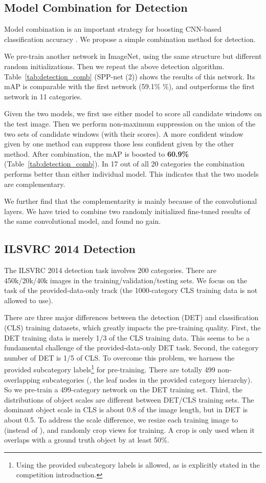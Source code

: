 \documentclass[10pt,journal,cspaper,compsoc]{IEEEtran}
\begin{document}
\subsection{Model Combination for Detection}

Model combination is an important strategy for boosting CNN-based classification accuracy \cite{Krizhevsky2012}. We propose a simple combination method for detection.

We pre-train another network in ImageNet, using the same structure but different random initializations. Then we repeat the above detection algorithm. Table~\ref{tab:detection_comb} (SPP-net (2)) shows the results of this network. Its mAP is comparable with the first network (59.1\% \%), and outperforms the first network in 11 categories.

Given the two models, we first use either model to score all candidate windows on the test image.
Then we perform non-maximum suppression on the union of the two sets of candidate windows (with their scores).
A more confident window given by one method can suppress those less confident given by the other method. After combination, the mAP is boosted to \textbf{60.9\%} (Table~\ref{tab:detection_comb}). In 17 out of all 20 categories the combination performs better than either individual model. This indicates that the two models are complementary.

We further find that the complementarity is mainly because of the convolutional layers. We have tried to combine two randomly initialized fine-tuned results of the same convolutional model, and found no gain.

\subsection{ILSVRC 2014 Detection}

The ILSVRC 2014 detection \cite{Russakovsky2014} task involves 200 categories. There are 450k/20k/40k images in the training/validation/testing sets. We focus on the task of the provided-data-only track (the 1000-category CLS training data is not allowed to use).

There are three major differences between the detection (DET) and classification (CLS) training datasets, which greatly impacts the pre-training quality. First, the DET training data is merely 1/3 of the CLS training data. This seems to be a fundamental challenge of the provided-data-only DET task. Second, the category number of DET is 1/5 of CLS. To overcome this problem, we harness the provided subcategory labels\footnote{Using the provided subcategory labels is allowed, as is explicitly stated in the competition introduction.} for pre-training. There are totally 499 non-overlapping subcategories (\ie, the leaf nodes in the provided category hierarchy). So we pre-train a 499-category network on the DET training set. Third, the distributions of object scales are different between DET/CLS training sets. The dominant object scale in CLS is about 0.8 of the image length, but in DET is about 0.5. To address the scale difference, we resize each training image to  (instead of ), and randomly crop  views for training. A crop is only used when it overlaps with a ground truth object by at least 50\%.
\end{document}

